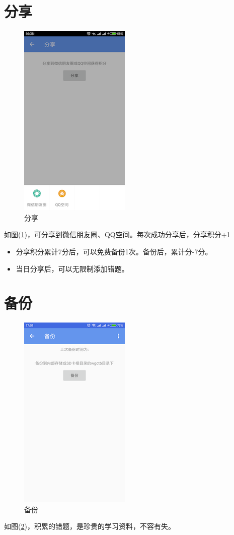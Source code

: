 \section{分享}
\begin{figure}[H]
	\centering
	\includegraphics{img/30.png}
	\caption{分享}
	\label{img30}
\end{figure}
如图(\ref{img30})，可分享到微信朋友圈、QQ空间。每次成功分享后，分享积分+1
\begin{itemize}
	\item 分享积分累计7分后，可以免费备份1次。备份后，累计分-7分。
	\item 当日分享后，可以无限制添加错题。
\end{itemize}

\section{备份}
\begin{figure}[H]
	\centering
	\includegraphics{img/31.png}
	\caption{备份}
	\label{img31}
\end{figure}
如图(\ref{img31})，积累的错题，是珍贵的学习资料，不容有失。

